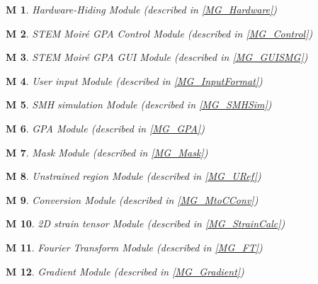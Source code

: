 \documentclass[12pt, titlepage]{article}
\newcommand{\progname}{STEM Moir{\'e} GPA}
\newtheorem{M}{M}
\begin{document}
\begin{M}\normalfont Hardware-Hiding Module (described in \cref{MG_Hardware})
\label{M_Hardware} 
\end{M}

\begin{M}\normalfont \progname{}  Control Module (described in \cref{MG_Control})
\label{M_Control}
\end{M}

\begin{M}\normalfont \progname{} GUI Module (described in \cref{MG_GUISMG})
\label{M_GUISMG}
\end{M}

\begin{M}\normalfont User input Module (described in \cref{MG_InputFormat})
\label{M_InputFormat}
\end{M}

\begin{M}\normalfont SMH simulation Module (described in \cref{MG_SMHSim})
\label{M_SMHSim}
\end{M}

\begin{M}\normalfont GPA Module (described in \cref{MG_GPA})
\label{M_GPA}
\end{M}

\begin{M}\normalfont Mask Module (described in \cref{MG_Mask})
\label{M_Mask}
\end{M}

\begin{M}\normalfont Unstrained region Module (described in \cref{MG_URef})
\label{M_URef}
\end{M}

\begin{M}\normalfont Conversion Module (described in \cref{MG_MtoCConv})
\label{M_MtoCConv}
\end{M}

\begin{M}\normalfont 2D strain tensor Module (described in \cref{MG_StrainCalc})
\label{M_StrainCalc}
\end{M}

\begin{M}\normalfont Fourier Transform Module (described in \cref{MG_FT})
\label{M_FT}
\end{M}

\begin{M}\normalfont Gradient Module (described in \cref{MG_Gradient})
\label{M_Gradient}
\end{M}
\end{document}
